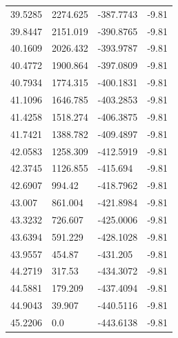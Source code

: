 \begin{table}[H]
\begin{tabular}{llll}
39.5285 & 2274.625 & -387.7743 & -9.81 \\
39.8447 & 2151.019 & -390.8765 & -9.81 \\
40.1609 & 2026.432 & -393.9787 & -9.81 \\
40.4772 & 1900.864 & -397.0809 & -9.81 \\
40.7934 & 1774.315 & -400.1831 & -9.81 \\
41.1096 & 1646.785 & -403.2853 & -9.81 \\
41.4258 & 1518.274 & -406.3875 & -9.81 \\
41.7421 & 1388.782 & -409.4897 & -9.81 \\
42.0583 & 1258.309 & -412.5919 & -9.81 \\
42.3745 & 1126.855 & -415.694 & -9.81 \\
42.6907 & 994.42 & -418.7962 & -9.81 \\
43.007 & 861.004 & -421.8984 & -9.81 \\
43.3232 & 726.607 & -425.0006 & -9.81 \\
43.6394 & 591.229 & -428.1028 & -9.81 \\
43.9557 & 454.87 & -431.205 & -9.81 \\
44.2719 & 317.53 & -434.3072 & -9.81 \\
44.5881 & 179.209 & -437.4094 & -9.81 \\
44.9043 & 39.907 & -440.5116 & -9.81 \\
45.2206 & 0.0 & -443.6138 & -9.81 \\
\bottomrule
\end{tabular}

\end{table}
